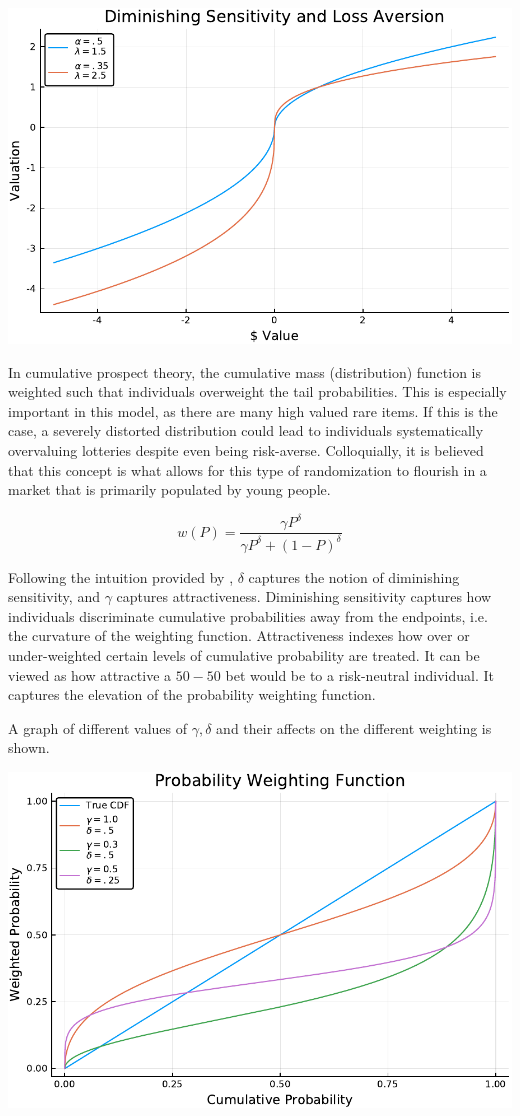 \documentclass[12pt]{paper}
\begin{document}
\begin{center}
\includegraphics[width=.75\linewidth]{../Plots/ValueFunction.pdf}
\end{center}



In cumulative prospect theory, the cumulative mass (distribution)
function is weighted such that individuals overweight the tail
probabilities. This is especially important in this model, as there are
many high valued rare items. If this is the case, a severely distorted
distribution could lead to individuals systematically overvaluing
lotteries despite even being risk-averse. Colloquially, it is believed
that this concept is what allows for this type of randomization to
flourish in a market that is primarily populated by young people.

\begin{equation*}
  w(P) = \frac{ \gamma P^\delta }{ \gamma P^\delta + (1-P)^\delta }
\end{equation*}

Following the intuition provided by \cite{GONZALEZ1999129}, $\delta$
captures the notion of diminishing sensitivity,
and $\gamma$ captures attractiveness. Diminishing sensitivity captures how
individuals discriminate cumulative probabilities away from the
endpoints, i.e. the curvature of the weighting
function. Attractiveness indexes how over or under-weighted certain
levels of cumulative probability are treated. It can be viewed as how
attractive a $50-50$ bet would be to a risk-neutral individual. It
captures the elevation of the probability weighting function.

A graph of different values of $\gamma,\delta$ and their affects on the
different weighting is shown. 

\begin{center}
\includegraphics[width=.75\linewidth]{../Plots/WeightFun.pdf}
\end{center}
\end{document}
